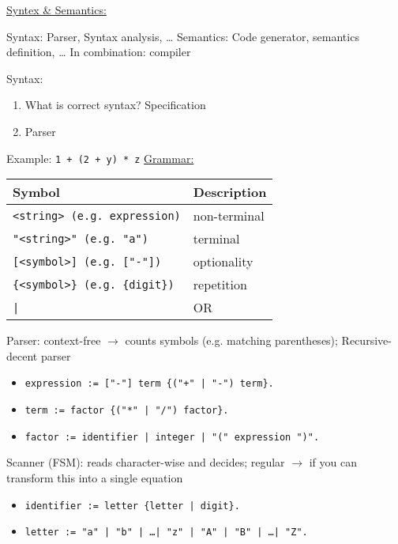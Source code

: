 \par{
	\noindent\underline{Syntex \& Semantics:}
	\par{
		\noindent
		Syntax: Parser, Syntax analysis, \ldots \newline
		Semantics: Code generator, semantics definition, \ldots \newline
		In combination: compiler
	}
	\par{
		\noindent Syntax:
		\parskip0pt\begin{enumerate}
			\item{What is correct syntax? Specification}
			\item{Parser}
		\end{enumerate}
	}
	\par{
		\noindent
		Example: \texttt{1 + (2 + y) * z} \newline\newline
		\underline{Grammar:}
		\par{
			\noindent
			\begin{center}
				\begin{tabular}{|l|l|}	
					\hline
					Symbol 									&	Description		\tabularnewline
					\hline
					\texttt{<string> (e.g. expression)}		&	non-terminal	\tabularnewline
					\texttt{"<string>" (e.g. "a")}			&	terminal 		\tabularnewline
					\texttt{[<symbol>] (e.g. ["-"])}		&	optionality		\tabularnewline
					\texttt{\{<symbol>\} (e.g. \{digit\})}	&	repetition		\tabularnewline
					\texttt{|}								&	OR 				\tabularnewline
					\hline
				\end{tabular}
			\end{center}
		}
		\noindent Parser: context-free $\rightarrow$ counts symbols (e.g. matching parentheses); Recursive-decent parser
		\parskip0pt\begin{itemize}
			\item[]{\texttt{expression := ["-"] term \{("+" | "-") term\}.}}
			\item[]{\texttt{term := factor \{("*" | "/") factor\}.}}
			\item[]{\texttt{factor := identifier | integer | "(" expression ")".}}
		\end{itemize}
		Scanner (FSM): reads character-wise and decides; regular $\rightarrow$ if you can transform this into a single equation
		\parskip0pt\begin{itemize}
			\item[]{\texttt{identifier := letter \{letter | digit\}.}}
			\item[]{\texttt{letter := "a" | "b" | \ldots | "z" | "A" | "B" | \ldots | "Z".}}

\end{itemize}}}
